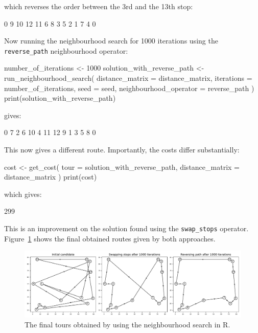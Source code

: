 which reverses the order
between the 3rd and the 13th stop:

\begin{Rout}
 [1]  0  9 10 12 11  6  8  3  5  2  1  7  4  0
\end{Rout}

Now running the neighbourhood search for 1000 iterations using the
\texttt{reverse_path} neighbourhood operator:

\begin{Rin}
number_of_iterations <- 1000
solution_with_reverse_path <- run_neighbourhood_search(
  distance_matrix = distance_matrix,
  iterations = number_of_iterations,
  seed = seed,
  neighbourhood_operator = reverse_path
)
print(solution_with_reverse_path)
\end{Rin}

gives:

\begin{Rout}
 [1]  0  7  2  6 10  4 11 12  9  1  3  5  8  0
\end{Rout}

This now gives a different route.
Importantly, the costs differ substantially:

\begin{Rin}
cost <- get_cost(
  tour = solution_with_reverse_path,
  distance_matrix = distance_matrix
)
print(cost)
\end{Rin}

which gives:

\begin{Rout}
[1] 299
\end{Rout}

This is an improvement on the solution found using the \texttt{swap_stops}
operator. Figure~\ref{fig:final-tsp-tours-r} shows the final obtained routes
given by both approaches.


\begin{figure}
    \begin{center}
        \includegraphics[width=\textwidth]{./assets/final-tsp-tours-with-R/main.pdf}
    \end{center}
    \caption{The final tours obtained by using the neighbourhood search in R.}
    \label{fig:final-tsp-tours-r}
\end{figure}


